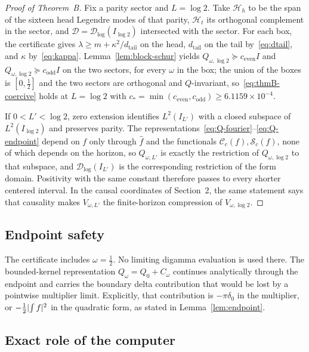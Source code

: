 \documentclass[11pt,a4paper]{article}
\newcommand{\Dlog}{\mathcal D_{\log}}
\newcommand{\Cc}{\mathcal C}
\newcommand{\Ss}{\mathcal S}
\newcommand{\Hcal}{\mathcal H}
\DeclarePairedDelimiter{\abs}{\lvert}{\rvert}
\theoremstyle{plain}
\theoremstyle{definition}
\numberwithin{equation}{section}
\begin{document}
\begin{proof}[Proof of Theorem~B]
Fix a parity sector and $L=\log2$. Take $\Hcal_h$ to be the span of the
sixteen head Legendre modes of that parity, $\Hcal_t$ its orthogonal
complement in the sector, and $\mathcal D=\Dlog(I_{\log2})$ intersected with
the sector. For each box, the certificate gives
$\lambda\ge m+\kappa^2/d_{\mathrm{tail}}$ on the head,
$d_{\mathrm{tail}}$ on the tail by~\eqref{eq:dtail}, and $\kappa$
by~\eqref{eq:kappa}. Lemma~\ref{lem:block-schur} yields
$Q_{\omega,\log2}\succeq c_{\mathrm{even}}I$ and
$Q_{\omega,\log2}\succeq c_{\mathrm{odd}}I$ on the two sectors, for every
$\omega$ in the box; the union of the boxes is $[0,\tfrac12]$ and the two
sectors are orthogonal and $Q$-invariant, so~\eqref{eq:thmB-coercive} holds at
$L=\log2$ with $c_*=\min(c_{\mathrm{even}},c_{\mathrm{odd}})\ge6.1159\times10^{-4}$.

If $0<L'<\log2$, zero extension identifies $L^2(I_{L'})$ with a closed subspace
of $L^2(I_{\log2})$ and preserves parity. The
representations~\eqref{eq:Q-fourier}--\eqref{eq:Q-endpoint} depend on $f$ only
through $\widehat f$ and the functionals $\Cc_c(f),\Ss_c(f)$, none of which
depends on the horizon, so $Q_{\omega,L'}$ is exactly the restriction of
$Q_{\omega,\log2}$ to that subspace, and $\Dlog(I_{L'})$ is the corresponding
restriction of the form domain. Positivity with the same constant therefore
passes to every shorter centered interval. In the causal coordinates of
Section~2, the same statement says that causality makes $V_{\omega,L'}$ the
finite-horizon compression of $V_{\omega,\log2}$.
\end{proof}

\subsection{Endpoint safety}

The certificate includes $\omega=\tfrac12$. No limiting digamma evaluation is
used there. The bounded-kernel representation $Q_\omega=Q_0+C_\omega$ continues
analytically through the endpoint and carries the boundary delta contribution
that would be lost by a pointwise multiplier limit. Explicitly, that
contribution is $-\pi\delta_0$ in the multiplier, or $-\tfrac12\abs{\int f}^2$
in the quadratic form, as stated in Lemma~\ref{lem:endpoint}.

\subsection{Exact role of the computer}
\end{document}
